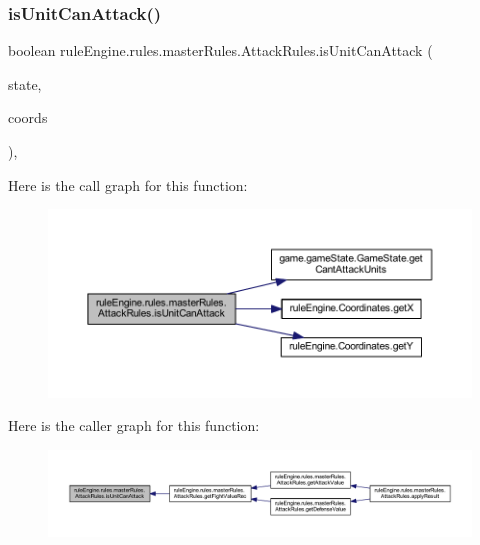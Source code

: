 \subsubsection{\texorpdfstring{is\+Unit\+Can\+Attack()}{isUnitCanAttack()}}
{\footnotesize\ttfamily boolean rule\+Engine.\+rules.\+master\+Rules.\+Attack\+Rules.\+is\+Unit\+Can\+Attack (\begin{DoxyParamCaption}\item[{\mbox{\hyperlink{classgame_1_1game_state_1_1_game_state}{Game\+State}}}]{state,  }\item[{\mbox{\hyperlink{classrule_engine_1_1_coordinates}{Coordinates}}}]{coords }\end{DoxyParamCaption})\hspace{0.3cm}{\ttfamily [inline]}, {\ttfamily [private]}}

Here is the call graph for this function\+:
\nopagebreak
\begin{figure}[H]
\begin{center}
\leavevmode
\includegraphics[width=350pt]{classrule_engine_1_1rules_1_1master_rules_1_1_attack_rules_a77e9058ba68078255c1b8080169ea651_cgraph}
\end{center}
\end{figure}
Here is the caller graph for this function\+:
\nopagebreak
\begin{figure}[H]
\begin{center}
\leavevmode
\includegraphics[width=350pt]{classrule_engine_1_1rules_1_1master_rules_1_1_attack_rules_a77e9058ba68078255c1b8080169ea651_icgraph}
\end{center}
\end{figure}
\mbox{\label{classrule_engine_1_1rules_1_1master_rules_1_1_attack_rules_ab487cbbc141d3f0db64c03466e690810}} 
